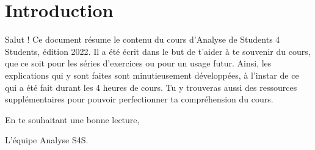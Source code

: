 \setcounter{chapter}{-1} %
\chapter{Introduction}
Salut ! Ce document résume le contenu du cours d'Analyse de Students 4 Students, édition 2022. Il a été écrit dans le but de t'aider à te souvenir du cours, que ce soit pour les séries d'exercices ou pour un usage futur. Ainsi, les explications qui y sont faites sont minutieusement développées, à l'instar de ce qui a été fait durant les 4 heures de cours. Tu y trouveras aussi des ressources supplémentaires pour pouvoir perfectionner ta compréhension du cours.

\smallskip
En te souhaitant une bonne lecture,
\smallskip

\hfill L'équipe Analyse S4S.